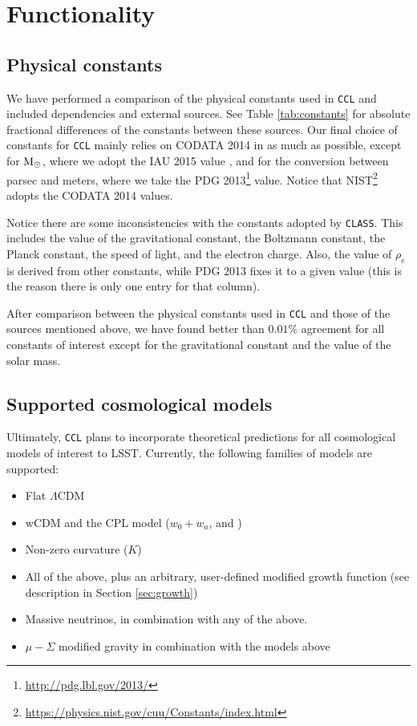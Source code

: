 \documentclass[\docopts]{\docclass}
\newcommand{\ccl}{{\tt CCL}\xspace}
\begin{document}
\section{Functionality}
\label{sec:func}

\subsection{Physical constants}
\label{sec:constants}
We have performed a comparison of the physical constants used in \ccl and
included dependencies and external sources. See Table \ref{tab:constants} for
absolute fractional differences of the constants between these sources. Our
final choice of constants for \ccl mainly relies on CODATA 2014 \citep{CODATA14}
in as much as possible, except for ${\rm M}_\odot$, where we adopt the IAU 2015
value \citep{IAU15}, and for the conversion between parsec and meters, where we
take the PDG 2013\footnote{\url{http://pdg.lbl.gov/2013/}} value. Notice that
NIST\footnote{\url{https://physics.nist.gov/cuu/Constants/index.html}} adopts
the CODATA 2014 values.

Notice there are some inconsistencies with the constants adopted by {\tt CLASS}.
This includes the value of the gravitational constant, the Boltzmann constant,
the Planck constant, the speed of light, and the electron charge. Also, the
value of $\rho_c$ is derived from other constants, while PDG 2013 fixes it to a
given value (this is the reason there is only one entry for that column).

After comparison between the physical constants used in \ccl and those of the
sources mentioned above, we have found better than $0.01\%$ agreement for all
constants of interest except for the gravitational constant and the value of the
solar mass.




\subsection{Supported cosmological models}
\label{sec:cosmologies}

Ultimately, \ccl plans to incorporate theoretical predictions for all
cosmological models of interest to LSST. Currently, the following families of
models are supported:
\begin{itemize}
    \item Flat $\Lambda$CDM
    \item wCDM and the CPL model ($w_0+w_a$, \citealt{Chevallier01} and \citealt{Linder03})
    \item Non-zero curvature ($K$)
    \item All of the above, plus an arbitrary, user-defined modified growth function (see description in Section \ref{sec:growth})
    \item Massive neutrinos, in combination with any of the above.
    \item $\mu-\Sigma$ modified gravity in combination with the models above
\end{itemize}
\end{document}
